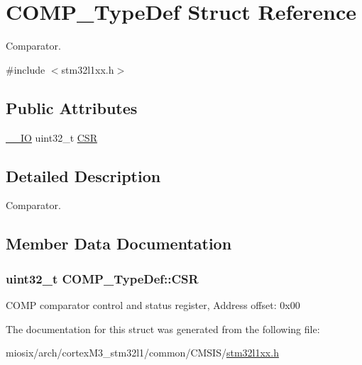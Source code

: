 \hypertarget{struct_c_o_m_p___type_def}{\section{C\-O\-M\-P\-\_\-\-Type\-Def Struct Reference}
\label{struct_c_o_m_p___type_def}
}


Comparator.  




{\ttfamily \#include $<$stm32l1xx.\-h$>$}

\subsection*{Public Attributes}
\begin{DoxyCompactItemize}
\item 
\hyperlink{group___c_m_s_i_s__core__definitions_gaec43007d9998a0a0e01faede4133d6be}{\-\_\-\-\_\-\-I\-O} uint32\-\_\-t \hyperlink{struct_c_o_m_p___type_def_ab894a4f70da24aa3c39b2c9a3790cbf8}{C\-S\-R}
\end{DoxyCompactItemize}


\subsection{Detailed Description}
Comparator. 

\subsection{Member Data Documentation}
\hypertarget{struct_c_o_m_p___type_def_ab894a4f70da24aa3c39b2c9a3790cbf8}{
\subsubsection[{C\-S\-R}]{ uint32\-\_\-t C\-O\-M\-P\-\_\-\-Type\-Def\-::\-C\-S\-R}}\label{struct_c_o_m_p___type_def_ab894a4f70da24aa3c39b2c9a3790cbf8}
C\-O\-M\-P comparator control and status register, Address offset\-: 0x00 

The documentation for this struct was generated from the following file\-:\begin{DoxyCompactItemize}
\item 
miosix/arch/cortex\-M3\-\_\-stm32l1/common/\-C\-M\-S\-I\-S/\hyperlink{stm32l1xx_8h}{stm32l1xx.\-h}\end{DoxyCompactItemize}
